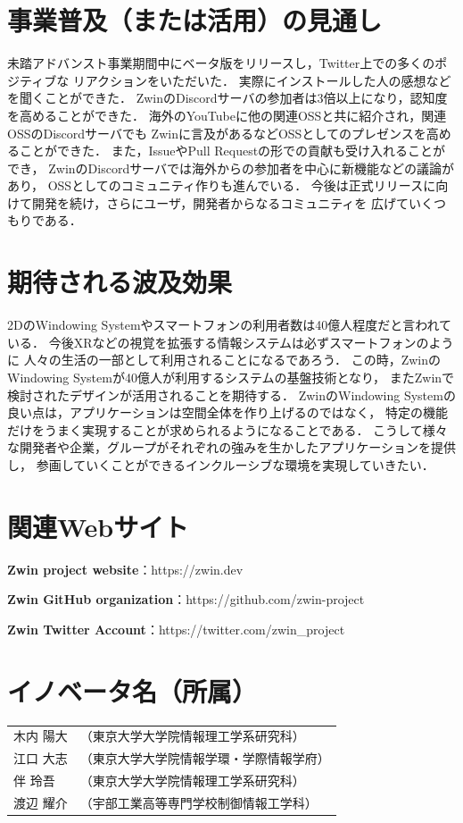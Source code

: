 \documentclass[12pt,a4paper]{jsarticle}
\begin{document}
\section{事業普及（または活用）の見通し}

未踏アドバンスト事業期間中にベータ版をリリースし，Twitter上での多くのポジティブな
リアクションをいただいた．
実際にインストールした人の感想などを聞くことができた．
ZwinのDiscordサーバの参加者は3倍以上になり，認知度を高めることができた．
海外のYouTubeに他の関連OSSと共に紹介され，関連OSSのDiscordサーバでも
Zwinに言及があるなどOSSとしてのプレゼンスを高めることができた．
また，IssueやPull Requestの形での貢献も受け入れることができ，
ZwinのDiscordサーバでは海外からの参加者を中心に新機能などの議論があり，
OSSとしてのコミュニティ作りも進んでいる．
今後は正式リリースに向けて開発を続け，さらにユーザ，開発者からなるコミュニティを
広げていくつもりである．

\section{期待される波及効果}

2DのWindowing Systemやスマートフォンの利用者数は40億人程度だと言われている．
今後XRなどの視覚を拡張する情報システムは必ずスマートフォンのように
人々の生活の一部として利用されることになるであろう．
この時，ZwinのWindowing Systemが40億人が利用するシステムの基盤技術となり，
またZwinで検討されたデザインが活用されることを期待する．
ZwinのWindowing Systemの良い点は，アプリケーションは空間全体を作り上げるのではなく，
特定の機能だけをうまく実現することが求められるようになることである．
こうして様々な開発者や企業，グループがそれぞれの強みを生かしたアプリケーションを提供し，
参画していくことができるインクルーシブな環境を実現していきたい．

\section{関連Webサイト}

\textbf{Zwin project website}：https://zwin.dev

\textbf{Zwin GitHub organization}：https://github.com/zwin-project

\textbf{Zwin Twitter Account}：https://twitter.com/zwin\_project

\section{イノベータ名（所属）}
\begin{table}[h]
  \begin{tabular}{ll}
    木内 陽大 & （東京大学大学院情報理工学系研究科）     \\
    江口 大志 & （東京大学大学院情報学環・学際情報学府） \\
    伴 玲吾   & （東京大学大学院情報理工学系研究科）     \\
    渡辺 耀介 & （宇部工業高等専門学校制御情報工学科）   \\
  \end{tabular}
\end{table}
\end{document}
